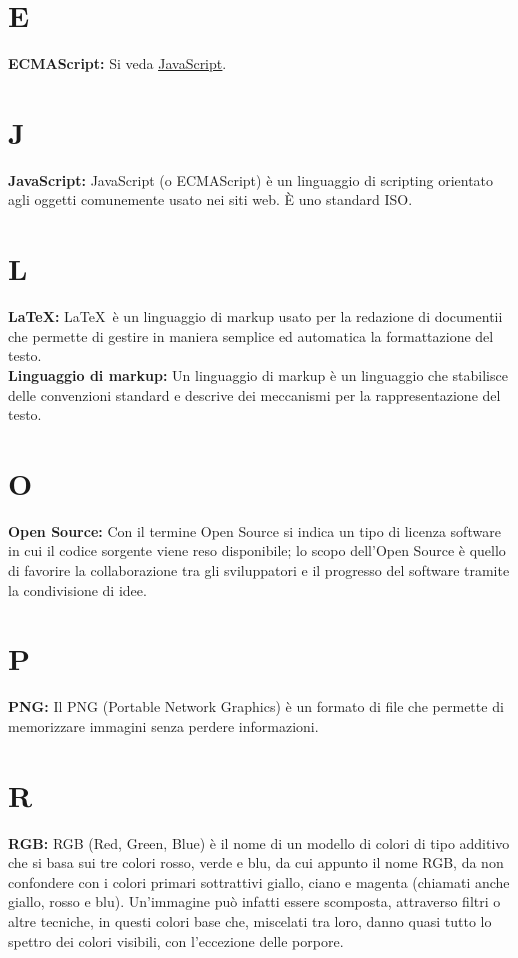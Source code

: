 \section*{E}
\hypertarget{ecmascript}{}
\textbf{ECMAScript:}
\text Si veda \hyperlink{javascript}{\underline{JavaScript}}.\\

\section*{J}
\hypertarget{javascript}{}
\textbf{JavaScript:}
JavaScript (o ECMAScript) \`e un linguaggio di scripting orientato agli oggetti comunemente usato nei siti web. \`E  uno standard ISO.\\

\section*{L}
\hypertarget{latex}{}
\textbf{\LaTeX:}
\LaTeX \ \`e un linguaggio di markup usato per la redazione di documentii che permette di gestire in maniera semplice ed automatica la formattazione del testo.\\

\textbf{Linguaggio di markup:}
\hypertarget{markup}{}
Un linguaggio di markup \`e un linguaggio che stabilisce delle convenzioni standard e descrive dei meccanismi per la rappresentazione del testo.\\

\section*{O}
\hypertarget{opensource}{}
\textbf{Open Source:}
Con il termine Open Source si indica un tipo di licenza software in cui il codice sorgente viene reso disponibile; lo scopo dell'Open Source \`e quello di favorire la collaborazione tra gli sviluppatori e il progresso del software tramite la condivisione di idee.\\

\section*{P}
\hypertarget{png}{}
\textbf{PNG:}
Il PNG (Portable Network Graphics) \`e un formato di file che permette di memorizzare immagini senza perdere informazioni.\\

\section*{R}
\hypertarget{rgb}{}
\textbf{RGB:}
RGB (Red, Green, Blue) \`e  il nome di un modello di colori di tipo additivo che si basa sui tre colori rosso, verde e blu, da cui appunto il nome RGB, da non confondere con i colori primari sottrattivi giallo, ciano e magenta (chiamati anche giallo, rosso e blu).
Un'immagine pu\`o  infatti essere scomposta, attraverso filtri o altre tecniche, in questi colori base che, miscelati tra loro, danno quasi tutto lo spettro dei colori visibili, con l'eccezione delle porpore.

